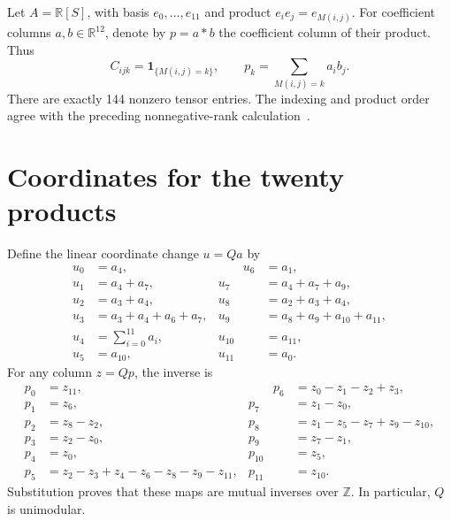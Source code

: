 \documentclass[11pt,a4paper]{article}
\newcommand{\R}{\mathbb R}\newcommand{\Q}{\mathbb Q}
\newcommand{\Z}{\mathbb Z}\newcommand{\ind}{\mathbf1}
\begin{document}
Let $A=\R[S]$, with basis $e_0,\ldots,e_{11}$ and product
$e_ie_j=e_{M(i,j)}$. For coefficient columns $a,b\in\R^{12}$, denote
by $p=a*b$ the coefficient column of their product. Thus
\begin{equation}\label{eq:product}
 C_{ijk}=\ind_{\{M(i,j)=k\}},\qquad
 p_k=\sum_{M(i,j)=k}a_ib_j.
\end{equation}
There are exactly 144 nonzero tensor entries. The indexing and product
order agree with the preceding nonnegative-rank calculation~\cite{positive}.

\section{Coordinates for the twenty products}\label{sec:coordinates}

Define the linear coordinate change $u=Qa$ by
\begin{equation}\label{eq:Q}
\begin{alignedat}{2}
 u_0&=a_4, &\qquad u_6&=a_1,\\
 u_1&=a_4+a_7, &u_7&=a_4+a_7+a_9,\\
 u_2&=a_3+a_4, &u_8&=a_2+a_3+a_4,\\
 u_3&=a_3+a_4+a_6+a_7, &u_9&=a_8+a_9+a_{10}+a_{11},\\
 u_4&=\sum_{i=0}^{11}a_i, &u_{10}&=a_{11},\\
 u_5&=a_{10}, &u_{11}&=a_0.
\end{alignedat}
\end{equation}
For any column $z=Qp$, the inverse is
\begin{equation}\label{eq:Qinv}
\begin{alignedat}{2}
 p_0&=z_{11}, &\qquad p_6&=z_0-z_1-z_2+z_3,\\
 p_1&=z_6, &p_7&=z_1-z_0,\\
 p_2&=z_8-z_2, &p_8&=z_1-z_5-z_7+z_9-z_{10},\\
 p_3&=z_2-z_0, &p_9&=z_7-z_1,\\
 p_4&=z_0, &p_{10}&=z_5,\\
 p_5&=z_2-z_3+z_4-z_6-z_8-z_9-z_{11},
 &p_{11}&=z_{10}.
\end{alignedat}
\end{equation}
Substitution proves that these maps are mutual inverses over $\Z$.
In particular, $Q$ is unimodular.
\end{document}
